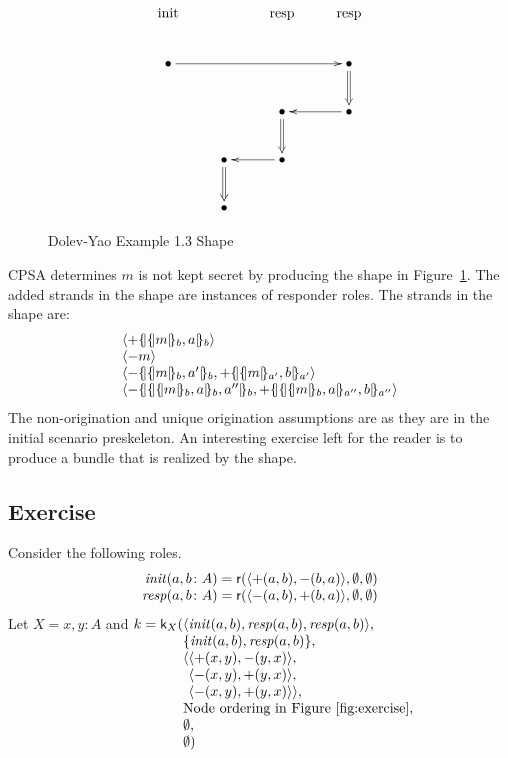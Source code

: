 \documentclass[12pt]{article}
\theoremstyle{definition}
\newcommand{\role}{\mathsf{r}}
\newcommand{\skel}{\mathsf{k}}
\newcommand{\init}{\fn{init}}
\newcommand{\resp}{\fn{resp}}
\begin{document}
\begin{figure}
$$\xymatrix{
\txt{\strut init}&\txt{\strut }&\txt{\strut resp}&\txt{\strut resp}\\
\bullet\ar[rrr]&&&\bullet\ar@{=>}[d]\\
&&\bullet\ar@{=>}[d]&\bullet\ar[l]\\
&\bullet\ar@{=>}[d]&\bullet\ar[l]&\\
&\bullet&&}$$
\caption{Dolev-Yao Example 1.3 Shape}\label{fig:dy shape}
\end{figure}

CPSA determines $m$ is not kept secret by producing the shape in
Figure~\ref{fig:dy shape}.  The added strands in the shape are
instances of responder roles.  The strands in the shape are:
$$\begin{array}{l}
\seq{\outbnd\enc{\enc{m}{b},a}{b}}\\
\seq{\inbnd m}\\
\seq{\inbnd\enc{\enc{m}{b},a'}{b},\outbnd\enc{\enc{m}{a'},b}{a'}}\\
\seq{\inbnd\enc{\enc{\enc{m}{b}, a}{b},a''}{b},
\outbnd\enc{\enc{\enc{m}{b},a}{a''},b}{a''}}
\end{array}$$
The non-origination and unique origination assumptions are as they are
in the initial scenario preskeleton.  An interesting exercise left for
the reader is to produce a bundle that is realized by the shape.

\subsection{Exercise}

Consider the following roles.
$$\begin{array}{r@{{}={}}l}
\init(a,b\colon A)&\role(\seq{\outbnd(a,b),\inbnd(b,a)},
\emptyset,\emptyset)\\
\resp(a,b\colon A)&\role(\seq{\inbnd(a,b),\outbnd(b,a)},
\emptyset,\emptyset)
\end{array}$$
Let $X=x,y\colon A$ and
$\begin{array}[t]{@{}r@{}l}
k=\skel_X(
&\seq{\init(a,b),\resp(a,b),\resp(a,b)},\\
&\{\init(a,b),\resp(a,b)\},\\
&\seq{\begin{array}[t]{@{}l}
\seq{\outbnd(x,y),\inbnd(y,x)},\\
\seq{\inbnd(x,y),\outbnd(y,x)},\\
\seq{\inbnd(x,y),\outbnd(y,x)}},
\end{array}\\
&\mbox{Node ordering in Figure~\ref{fig:exercise}},\\
&\emptyset,\\
&\emptyset)
\end{array}$
\end{document}
